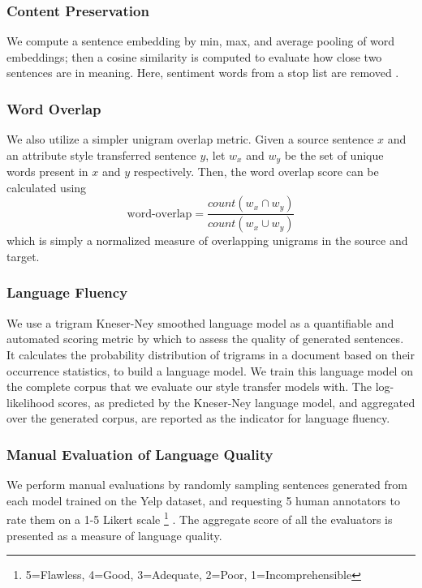 \documentclass[11pt,a4paper]{article}
\begin{document}
\subsubsection{Content Preservation}
We compute a sentence embedding by min, max, and average pooling of word embeddings; then a cosine similarity is computed to evaluate how close two sentences are in meaning. Here, sentiment words from a stop list \cite{hu2004mining} are removed \cite{fu2017style}.

\subsubsection{Word Overlap}
We also utilize a simpler unigram overlap metric. Given a source sentence $x$ and an attribute style transferred sentence $y$, let $w_x$ and $w_y$ be the set of unique words present in $x$ and $y$ respectively. Then, the word overlap score can be calculated using $$\text{word-overlap} = \frac{count(w_x \cap w_y)}{count(w_x \cup w_y)}$$ which is simply a normalized measure of overlapping unigrams in the source and target.

\subsubsection{Language Fluency}
We use a trigram Kneser-Ney smoothed language model \citep{kneser1995improved} as a quantifiable and automated scoring metric by which to assess the quality of generated sentences. It calculates the probability distribution of trigrams in a document based on their occurrence statistics, to build a language model. We train this language model on the complete corpus that we evaluate our style transfer models with. The log-likelihood scores, as predicted by the Kneser-Ney language model, and aggregated over the generated corpus, are reported as the indicator for language fluency.

\subsubsection{Manual Evaluation of Language Quality}
We perform manual evaluations by randomly sampling sentences generated from each model trained on the Yelp dataset, and requesting 5 human annotators to rate them on a 1-5 Likert scale \footnote{5=Flawless, 4=Good, 3=Adequate, 2=Poor, 1=Incomprehensible} \citep{stent2005evaluating}. The aggregate score of all the evaluators is presented as a measure of language quality.
\end{document}
